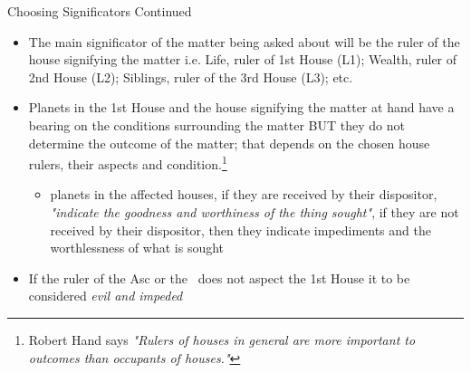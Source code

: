 \begin{frame}[t]{Choosing Significators Continued}
\begin{itemize}
\item The main significator of the matter being asked about will be the ruler of the house signifying the matter i.e. Life, ruler of 1st House (L1); Wealth, ruler of 2nd House (L2); Siblings, ruler of the 3rd House (L3); etc.
\item Planets in the 1st House and the house signifying the matter at hand have a bearing on the conditions surrounding the matter BUT they do not determine the outcome of the matter; that depends on the chosen house rulers, their aspects and condition.\footnote{Robert Hand says \textsl{"Rulers of houses in general are more important to outcomes than occupants of houses."}}
	\begin{itemize}
		\item planets in the affected houses, if they are received by their dispositor, \textsl{"indicate the goodness and worthiness of the thing sought"}, if they are not received by their dispositor, then they indicate impediments and the worthlessness of what is sought
	\end{itemize}
\item If the ruler of the Asc or the \Moon\ does not aspect the 1st House it to be considered \textsl{evil and impeded}
\end{itemize}

\end{frame}